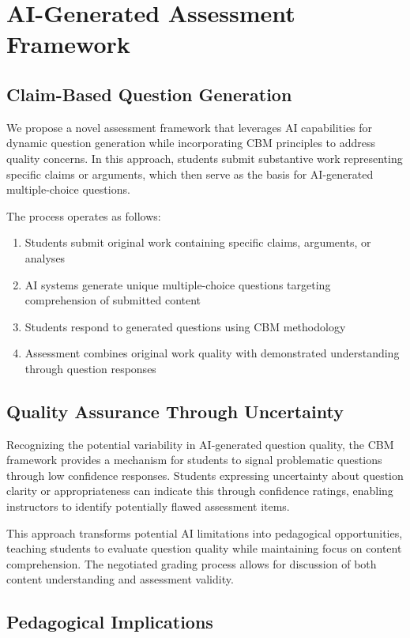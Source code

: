 \documentclass[sigconf]{acmart}
\begin{document}
\section{AI-Generated Assessment Framework}

\subsection{Claim-Based Question Generation}

We propose a novel assessment framework that leverages AI capabilities for dynamic question generation while incorporating CBM principles to address quality concerns. In this approach, students submit substantive work representing specific claims or arguments, which then serve as the basis for AI-generated multiple-choice questions.

The process operates as follows:
\begin{enumerate}
\item Students submit original work containing specific claims, arguments, or analyses
\item AI systems generate unique multiple-choice questions targeting comprehension of submitted content
\item Students respond to generated questions using CBM methodology
\item Assessment combines original work quality with demonstrated understanding through question responses
\end{enumerate}

\subsection{Quality Assurance Through Uncertainty}

Recognizing the potential variability in AI-generated question quality, the CBM framework provides a mechanism for students to signal problematic questions through low confidence responses. Students expressing uncertainty about question clarity or appropriateness can indicate this through confidence ratings, enabling instructors to identify potentially flawed assessment items.

This approach transforms potential AI limitations into pedagogical opportunities, teaching students to evaluate question quality while maintaining focus on content comprehension. The negotiated grading process allows for discussion of both content understanding and assessment validity.

\subsection{Pedagogical Implications}
\end{document}
